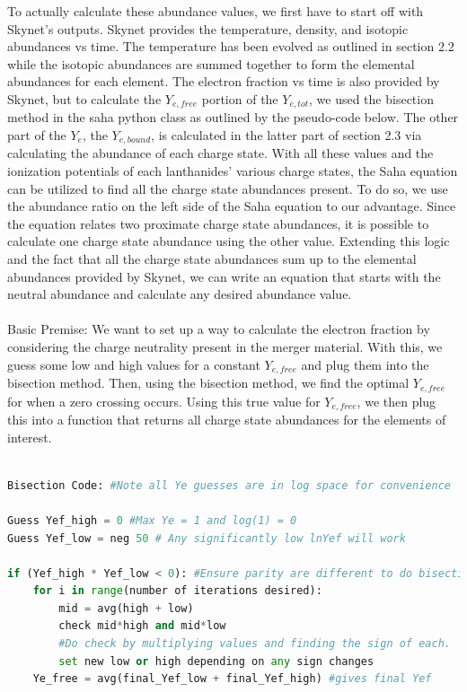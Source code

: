 \documentclass[11pt,a4paper]{article}
\begin{document}
To actually calculate these abundance values, we first have to start off with Skynet's outputs. Skynet provides the temperature, density, and isotopic abundances vs time. The temperature has been evolved as outlined in section 2.2 while the isotopic abundances are summed together to form the elemental abundances for each element. The electron fraction vs time is also provided by Skynet, but to calculate the $Y_{e,free}$ portion of the $Y_{e,tot}$, we used the bisection method in the saha python class as outlined by the pseudo-code below. The other part of the $Y_e$, the $Y_{e,bound}$, is calculated in the latter part of section 2.3 via calculating the abundance of each charge state. With all these values and the ionization potentials of each lanthanides' various charge states, the Saha equation can be utilized to find all the charge state abundances present. To do so, we use the abundance ratio on the left side of the Saha equation to our advantage. Since the equation relates two proximate charge state abundances, it is possible to calculate one charge state abundance using the other value. Extending this logic and the fact that all the charge state abundances sum up to the elemental abundances provided by Skynet, we can write an equation that starts with the neutral abundance and calculate any desired abundance value. \\

\\
Basic Premise: We want to set up a way to calculate the electron fraction by considering the charge neutrality present in the merger material. With this, we guess some low and high values for a constant $Y_{e,free}$ and plug them into the bisection method. Then, using the bisection method, we find the optimal $Y_{e,free}$ for when a zero crossing occurs. Using this true value for $Y_{e,free}$, we then plug this into a function that returns all charge
state abundances for the elements of interest. 

\begin{lstlisting}[language=Python]
			
Bisection Code: #Note all Ye guesses are in log space for convenience

Guess Yef_high = 0 #Max Ye = 1 and log(1) = 0
Guess Yef_low = neg 50 # Any significantly low lnYef will work

if (Yef_high * Yef_low < 0): #Ensure parity are different to do bisection
	for i in range(number of iterations desired):
		mid = avg(high + low)
		check mid*high and mid*low 
		#Do check by multiplying values and finding the sign of each.
		set new low or high depending on any sign changes		
	Ye_free = avg(final_Yef_low + final_Yef_high) #gives final Yef
	
\end{lstlisting}
\end{document}
